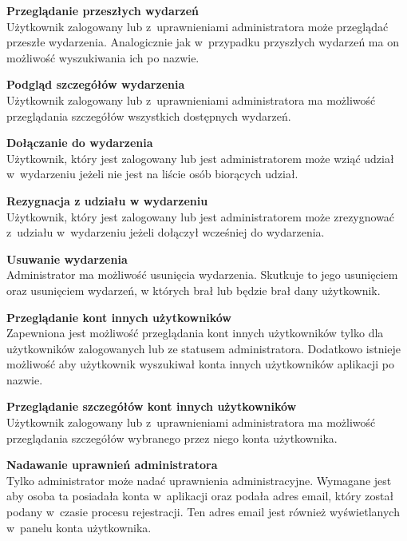 \documentclass[../Kamil_Kowalewski_Main.tex]{subfiles}
\begin{document}
{{{            \noindent\textbf{Przeglądanie przeszłych wydarzeń}\\
            \indent Użytkownik zalogowany lub z~uprawnieniami administratora może
            przeglądać przeszłe wydarzenia. Analogicznie jak w~przypadku przyszłych
            wydarzeń ma on możliwość wyszukiwania ich po nazwie.

            \noindent\textbf{Podgląd szczegółów wydarzenia}\\
            \indent Użytkownik zalogowany lub z~uprawnieniami administratora ma
            możliwość przeglądania szczegółów wszystkich dostępnych wydarzeń.

            \noindent\textbf{Dołączanie do wydarzenia}\\
            \indent Użytkownik, który jest zalogowany lub jest administratorem może
            wziąć udział w~wydarzeniu jeżeli nie jest na liście osób biorących udział.

            \noindent\textbf{Rezygnacja z udziału w wydarzeniu}\\
            \indent Użytkownik, który jest zalogowany lub jest administratorem może
            zrezygnować z~udziału w~wydarzeniu jeżeli dołączył wcześniej do wydarzenia.

            \noindent\textbf{Usuwanie wydarzenia}\\
            \indent Administrator ma możliwość usunięcia wydarzenia. Skutkuje to jego
            usunięciem oraz usunięciem wydarzeń, w których brał lub będzie brał dany
            użytkownik.

            \noindent\textbf{Przeglądanie kont innych użytkowników}\\
            \indent Zapewniona jest możliwość przeglądania kont innych użytkowników tylko
            dla użytkowników zalogowanych lub ze statusem administratora. Dodatkowo
            istnieje możliwość aby użytkownik wyszukiwał konta innych użytkowników
            aplikacji po nazwie.

            \noindent\textbf{Przeglądanie szczegółów kont innych użytkowników}\\
            \indent Użytkownik zalogowany lub z~uprawnieniami administratora ma
            możliwość przeglądania szczegółów wybranego przez niego konta użytkownika.

            \noindent\textbf{Nadawanie uprawnień administratora}\\
            \indent Tylko administrator może nadać uprawnienia administracyjne.
            Wymagane jest aby osoba ta posiadała konta w~aplikacji oraz podała adres
            email, który został podany w~czasie procesu rejestracji. Ten adres email jest
            również wyświetlanych w~panelu konta użytkownika.
        }

}}
\end{document}
